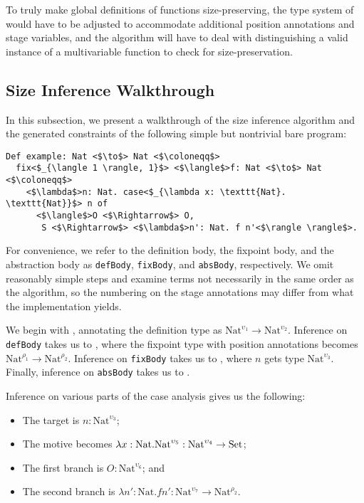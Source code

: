 \documentclass[nonacm,screen,10pt]{acmart}
\begin{document}
To truly make global definitions of functions size-preserving, the type system of \lang would have to be adjusted to accommodate additional position annotations and stage variables, and the algorithm will have to deal with distinguishing a valid instance of a multivariable function to check for size-preservation.

\subsection{Size Inference Walkthrough}
In this subsection, we present a walkthrough of the size inference algorithm and the generated constraints of the following simple but nontrivial bare \lang program:

\begin{verbatim}
Def example: Nat <$\to$> Nat <$\coloneqq$>
  fix<$_{\langle 1 \rangle, 1}$> <$\langle$>f: Nat <$\to$> Nat <$\coloneqq$>
    <$\lambda$>n: Nat. case<$_{\lambda x: \texttt{Nat}. \texttt{Nat}}$> n of
      <$\langle$>O <$\Rightarrow$> O,
       S <$\Rightarrow$> <$\lambda$>n': Nat. f n'<$\rangle \rangle$>.
\end{verbatim}

For convenience, we refer to the definition body, the fixpoint body, and the abstraction body as \texttt{defBody}, \texttt{fixBody}, and \texttt{absBody}, respectively. We omit reasonably simple steps and examine terms not necessarily in the same order as the algorithm, so the numbering on the stage annotations may differ from what the implementation yields.

We begin with , annotating the definition type as $\text{Nat}^{\upsilon_1} \to \text{Nat}^{\upsilon_2}$. Inference on \texttt{defBody} takes us to , where the fixpoint type with position annotations becomes $\text{Nat}^{\rho_1} \to \text{Nat}^{\rho_2}$. Inference on \texttt{fixBody} takes us to , where $n$ gets type $\text{Nat}^{\upsilon_3}$. Finally, inference on \texttt{absBody} takes us to .

Inference on various parts of the case analysis gives us the following:
\begin{itemize}
    \item The target is $n: \text{Nat}^{\upsilon_3}$;
    \item The motive becomes $\lambda x: \text{Nat}. \text{Nat}^{\upsilon_5} : \text{Nat}^{\upsilon_4} \to \text{Set}$;
    \item The first branch is $O: \text{Nat}^{\upsilon_6}$; and
    \item The second branch is $\lambda n': \text{Nat}. f n': \text{Nat}^{\upsilon_7} \to \text{Nat}^{\rho_2}$.
\end{itemize}
\end{document}

